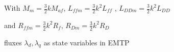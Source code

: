 With $M_m = \frac{3}{2} k M_{af}$, $L_{ffm} = \frac{3}{2} k^2 L_{ff}$ , $L_{DDm} = \frac{3}{2} k^2 L_{DD}$


and $R_{ffm} = \frac{3}{2} k^2 R_f$,  $R_{Dm} = \frac{3}{2} k^2 R_D$


fluxes $\lambda_d, \lambda_q$ as state variables in EMTP









